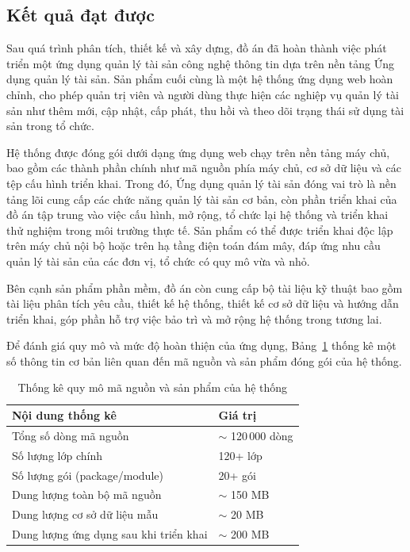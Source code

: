 \documentclass[../DoAn.tex]{subfiles}
\begin{document}
\subsection{Kết quả đạt được}

Sau quá trình phân tích, thiết kế và xây dựng, đồ án đã hoàn thành việc phát triển một ứng dụng quản lý tài sản công nghệ thông tin dựa trên nền tảng Ứng dụng quản lý tài sản. Sản phẩm cuối cùng là một hệ thống ứng dụng web hoàn chỉnh, cho phép quản trị viên và người dùng thực hiện các nghiệp vụ quản lý tài sản như thêm mới, cập nhật, cấp phát, thu hồi và theo dõi trạng thái sử dụng tài sản trong tổ chức.

Hệ thống được đóng gói dưới dạng ứng dụng web chạy trên nền tảng máy chủ, bao gồm các thành phần chính như mã nguồn phía máy chủ, cơ sở dữ liệu và các tệp cấu hình triển khai. Trong đó, Ứng dụng quản lý tài sản đóng vai trò là nền tảng lõi cung cấp các chức năng quản lý tài sản cơ bản, còn phần triển khai của đồ án tập trung vào việc cấu hình, mở rộng, tổ chức lại hệ thống và triển khai thử nghiệm trong môi trường thực tế. Sản phẩm có thể được triển khai độc lập trên máy chủ nội bộ hoặc trên hạ tầng điện toán đám mây, đáp ứng nhu cầu quản lý tài sản của các đơn vị, tổ chức có quy mô vừa và nhỏ.

Bên cạnh sản phẩm phần mềm, đồ án còn cung cấp bộ tài liệu kỹ thuật bao gồm tài liệu phân tích yêu cầu, thiết kế hệ thống, thiết kế cơ sở dữ liệu và hướng dẫn triển khai, góp phần hỗ trợ việc bảo trì và mở rộng hệ thống trong tương lai.

Để đánh giá quy mô và mức độ hoàn thiện của ứng dụng, Bảng~\ref{table:statistic} thống kê một số thông tin cơ bản liên quan đến mã nguồn và sản phẩm đóng gói của hệ thống.
\begin{table}[H]
\centering
\renewcommand{\arraystretch}{1.3}
\begin{tabular}{p{6cm} p{6cm}}
\hline
\textbf{Nội dung thống kê} & \textbf{Giá trị} \\ \hline
Tổng số dòng mã nguồn & $\sim$ 120\,000 dòng \\ \hline
Số lượng lớp chính & 120+ lớp \\ \hline
Số lượng gói (package/module) & 20+ gói \\ \hline
Dung lượng toàn bộ mã nguồn & $\sim$ 150 MB \\ \hline
Dung lượng cơ sở dữ liệu mẫu & $\sim$ 20 MB \\ \hline
Dung lượng ứng dụng sau khi triển khai & $\sim$ 200 MB \\ \hline
\end{tabular}
\caption{Thống kê quy mô mã nguồn và sản phẩm của hệ thống}
\label{table:statistic}
\end{table}
\end{document}
